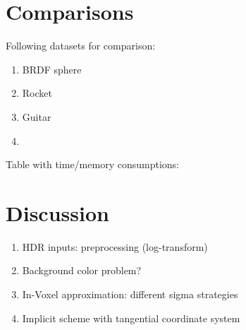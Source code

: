



\section{Comparisons}



Following datasets for comparison:
\begin{enumerate}
    \item BRDF sphere
    \item Rocket
    \item Guitar
    \item \color{orange}{Trophy/donut/tablelamp}
\end{enumerate}



Table with time/memory consumptions:



\section{Discussion}

\begin{enumerate}
    \item HDR inputs: preprocessing (log-transform)
    \item Background color problem?
    \item In-Voxel approximation: different sigma strategies
    \item Implicit scheme with tangential coordinate system
\end{enumerate}


